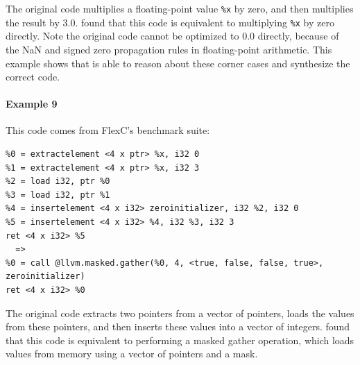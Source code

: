 The original code multiplies a floating-point value \texttt{\%x} by
zero, and then multiplies the result by 3.0. \minotaur{} found that this
code is equivalent to multiplying \texttt{\%x} by zero directly.
Note the original code cannot be optimized to 0.0 directly, because of
the NaN and signed zero propagation rules in floating-point arithmetic.
This example shows that \minotaur{} is able to reason about these corner
cases and synthesize the correct code.

\paragraph*{Example 9}

This code comes from FlexC's benchmark suite:

{\begin{quoting}\begin{Verbatim}
%0 = extractelement <4 x ptr> %x, i32 0
%1 = extractelement <4 x ptr> %x, i32 3
%2 = load i32, ptr %0
%3 = load i32, ptr %1
%4 = insertelement <4 x i32> zeroinitializer, i32 %2, i32 0
%5 = insertelement <4 x i32> %4, i32 %3, i32 3
ret <4 x i32> %5
  =>
%0 = call @llvm.masked.gather(%0, 4, <true, false, false, true>, zeroinitializer)
ret <4 x i32> %0
\end{Verbatim}
\end{quoting}}

The original code extracts two pointers from a vector of pointers,
loads the values from these pointers, and then inserts these values
into a vector of integers. \minotaur{} found that this code is equivalent
to performing a masked gather operation, which loads values from
memory using a vector of pointers and a mask.